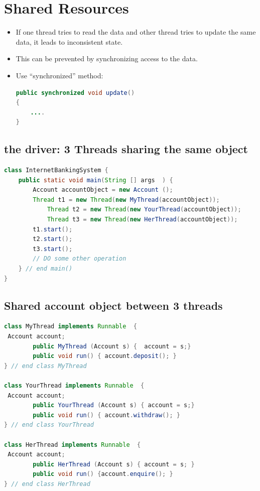 \documentclass[12pt, a4paper]{book}
\begin{document}
\section{Shared Resources}
\begin{itemize}
    \item If one thread tries to read the data and other thread tries to update the same data, it leads to inconsistent state.
    \item This can be prevented by synchronizing access to the data.
    \item Use “synchronized” method:
          \begin{lstlisting}[language=java]
public synchronized void update()
{
    ....
}
            \end{lstlisting}
\end{itemize}
\subsection{the driver: 3 Threads sharing the same object}
\begin{lstlisting}[language=java]
class InternetBankingSystem {
    public static void main(String [] args  ) {
        Account accountObject = new Account (); 
        Thread t1 = new Thread(new MyThread(accountObject));
            Thread t2 = new Thread(new YourThread(accountObject));
            Thread t3 = new Thread(new HerThread(accountObject));
        t1.start();
        t2.start();
        t3.start();
        // DO some other operation
    } // end main()
}
\end{lstlisting}
\subsection{Shared account object between 3 threads}
\begin{lstlisting}[language=java]
class MyThread implements Runnable  {
 Account account;
        public MyThread (Account s) {  account = s;}
        public void run() { account.deposit(); }
} // end class MyThread

class YourThread implements Runnable  {
 Account account;
        public YourThread (Account s) { account = s;}
        public void run() { account.withdraw(); }
} // end class YourThread

class HerThread implements Runnable  {
 Account account;
        public HerThread (Account s) { account = s; }
        public void run() {account.enquire(); }
} // end class HerThread
    \end{lstlisting}
\end{document}
